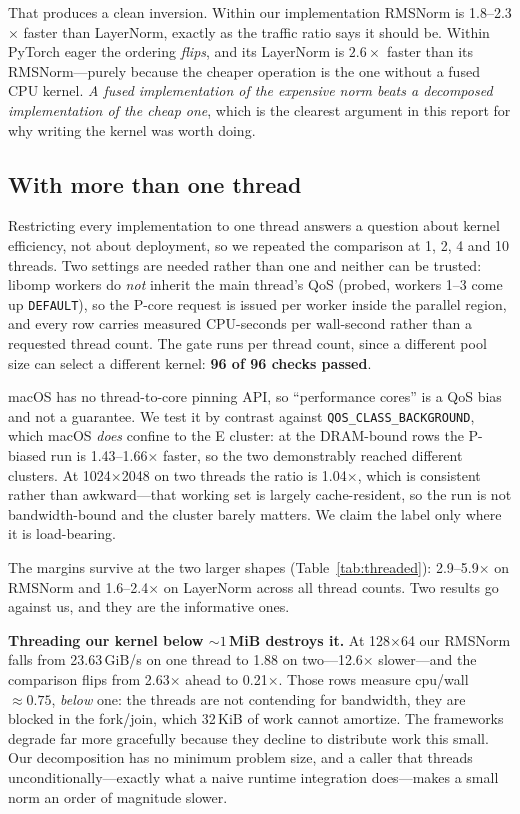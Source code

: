 \documentclass[conference,10pt]{IEEEtran}
\newcommand{\code}[1]{\texttt{\small #1}}
\begin{document}
That produces a clean inversion. Within our implementation RMSNorm is
1.8--2.3$\times$ faster than LayerNorm, exactly as the traffic ratio says it
should be. Within PyTorch eager the ordering \emph{flips}, and its LayerNorm is
$2.6\times$ faster than its RMSNorm---purely because the cheaper operation is
the one without a fused CPU kernel. \emph{A fused implementation of the
expensive norm beats a decomposed implementation of the cheap one}, which is the
clearest argument in this report for why writing the kernel was worth doing.

\subsection{With more than one thread}
\label{sec:threaded}

Restricting every implementation to one thread answers a question about kernel
efficiency, not about deployment, so we repeated the comparison at 1, 2, 4 and
10 threads. Two settings are needed rather than one and neither can be trusted:
libomp workers do \emph{not} inherit the main thread's QoS (probed, workers
1--3 come up \code{DEFAULT}), so the P-core request is issued per worker inside
the parallel region, and every row carries measured CPU-seconds per wall-second
rather than a requested thread count. The gate runs per thread count, since a
different pool size can select a different kernel: \textbf{96 of 96 checks
passed}.

macOS has no thread-to-core pinning API, so ``performance cores'' is a QoS bias
and not a guarantee. We test it by contrast against \code{QOS\_CLASS\_BACKGROUND},
which macOS \emph{does} confine to the E cluster: at the DRAM-bound rows the
P-biased run is 1.43--1.66$\times$ faster, so the two demonstrably reached
different clusters. At 1024$\times$2048 on two threads the ratio is 1.04$\times$,
which is consistent rather than awkward---that working set is largely
cache-resident, so the run is not bandwidth-bound and the cluster barely
matters. We claim the label only where it is load-bearing.

The margins survive at the two larger shapes (Table~\ref{tab:threaded}):
2.9--5.9$\times$ on RMSNorm and 1.6--2.4$\times$ on LayerNorm across all thread
counts. Two results go against us, and they are the informative ones.

\textbf{Threading our kernel below ${\sim}1$\,MiB destroys it.} At
128$\times$64 our RMSNorm falls from 23.63\,GiB/s on one thread to 1.88 on
two---12.6$\times$ slower---and the comparison flips from 2.63$\times$ ahead to
0.21$\times$. Those rows measure cpu/wall ${\approx}0.75$, \emph{below} one: the
threads are not contending for bandwidth, they are blocked in the fork/join,
which 32\,KiB of work cannot amortize. The frameworks degrade far more
gracefully because they decline to distribute work this small. Our
decomposition has no minimum problem size, and a caller that threads
unconditionally---exactly what a naive runtime integration does---makes a small
norm an order of magnitude slower.
\end{document}
